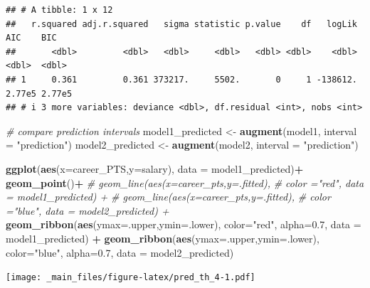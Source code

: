 \documentclass[
]{book}
\newenvironment{Shaded}{\begin{snugshade}}{\end{snugshade}}
\newcommand{\AttributeTok}[1]{\textcolor[rgb]{0.13,0.29,0.53}{#1}}
\newcommand{\CommentTok}[1]{\textcolor[rgb]{0.56,0.35,0.01}{\textit{#1}}}
\newcommand{\FloatTok}[1]{\textcolor[rgb]{0.00,0.00,0.81}{#1}}
\newcommand{\FunctionTok}[1]{\textcolor[rgb]{0.13,0.29,0.53}{\textbf{#1}}}
\newcommand{\NormalTok}[1]{#1}
\newcommand{\OtherTok}[1]{\textcolor[rgb]{0.56,0.35,0.01}{#1}}
\newcommand{\SpecialCharTok}[1]{\textcolor[rgb]{0.81,0.36,0.00}{\textbf{#1}}}
\newcommand{\StringTok}[1]{\textcolor[rgb]{0.31,0.60,0.02}{#1}}
\begin{document}
\begin{verbatim}
## # A tibble: 1 x 12
##   r.squared adj.r.squared   sigma statistic p.value    df   logLik    AIC    BIC
##       <dbl>         <dbl>   <dbl>     <dbl>   <dbl> <dbl>    <dbl>  <dbl>  <dbl>
## 1     0.361         0.361 373217.     5502.       0     1 -138612. 2.77e5 2.77e5
## # i 3 more variables: deviance <dbl>, df.residual <int>, nobs <int>
\end{verbatim}

\begin{Shaded}
\begin{Highlighting}[]
\CommentTok{\# compare prediction intervals}
\NormalTok{model1\_predicted }\OtherTok{\textless{}{-}} \FunctionTok{augment}\NormalTok{(model1, }\AttributeTok{interval =} \StringTok{"prediction"}\NormalTok{)}
\NormalTok{model2\_predicted }\OtherTok{\textless{}{-}} \FunctionTok{augment}\NormalTok{(model2, }\AttributeTok{interval =} \StringTok{"prediction"}\NormalTok{)}

  \FunctionTok{ggplot}\NormalTok{(}\FunctionTok{aes}\NormalTok{(}\AttributeTok{x=}\NormalTok{career\_PTS,}\AttributeTok{y=}\NormalTok{salary), }\AttributeTok{data =}\NormalTok{ model1\_predicted)}\SpecialCharTok{+}
  \FunctionTok{geom\_point}\NormalTok{()}\SpecialCharTok{+}
  \CommentTok{\# geom\_line(aes(x=career\_pts,y=.fitted),}
  \CommentTok{\#           color ="red", data = model1\_predicted) +}
  \CommentTok{\# geom\_line(aes(x=career\_pts,y=.fitted),}
  \CommentTok{\#          color ="blue", data = model2\_predicted) +}
  \FunctionTok{geom\_ribbon}\NormalTok{(}\FunctionTok{aes}\NormalTok{(}\AttributeTok{ymax=}\NormalTok{.upper,}\AttributeTok{ymin=}\NormalTok{.lower),}
              \AttributeTok{color=}\StringTok{"red"}\NormalTok{,}
              \AttributeTok{alpha=}\FloatTok{0.7}\NormalTok{,}
              \AttributeTok{data =}\NormalTok{ model1\_predicted) }\SpecialCharTok{+}
  \FunctionTok{geom\_ribbon}\NormalTok{(}\FunctionTok{aes}\NormalTok{(}\AttributeTok{ymax=}\NormalTok{.upper,}\AttributeTok{ymin=}\NormalTok{.lower),}
              \AttributeTok{color=}\StringTok{"blue"}\NormalTok{,}
              \AttributeTok{alpha=}\FloatTok{0.7}\NormalTok{,}
              \AttributeTok{data =}\NormalTok{ model2\_predicted)}
\end{Highlighting}
\end{Shaded}

\texttt{[image: \_main\_files/figure-latex/pred\_th\_4-1.pdf]}

\begin{Shaded}
\end{Shaded}
\end{document}
